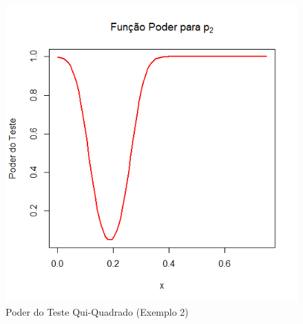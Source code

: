 \documentclass[12pt]{beamer}
\begin{document}
\begin{frame}{}
\begin{block}{}
\begin{figure}
    \centering
    \includegraphics[scale=0.5]{figs/Ex2p2.png}
    \caption{Poder do Teste Qui-Quadrado (Exemplo 2)}
    \label{fig:enter-label}
\end{figure}
\end{block}
\end{frame}
\end{document}
